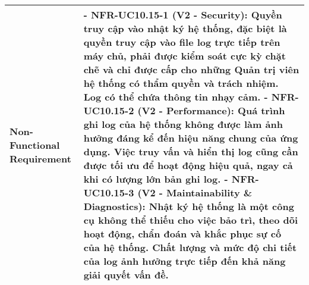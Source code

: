 \begin{longtable}{|m{4cm}|p{11cm}|}
Non-Functional Requirement & - \textbf{NFR-UC10.15-1 (V2 - Security):} Quyền truy cập vào nhật ký hệ thống, đặc biệt là quyền truy cập vào file log trực tiếp trên máy chủ, phải được kiểm soát cực kỳ chặt chẽ và chỉ được cấp cho những Quản trị viên hệ thống có thẩm quyền và trách nhiệm. Log có thể chứa thông tin nhạy cảm. \newline - \textbf{NFR-UC10.15-2 (V2 - Performance):} Quá trình ghi log của hệ thống không được làm ảnh hưởng đáng kể đến hiệu năng chung của ứng dụng. Việc truy vấn và hiển thị log cũng cần được tối ưu để hoạt động hiệu quả, ngay cả khi có lượng lớn bản ghi log. \newline - \textbf{NFR-UC10.15-3 (V2 - Maintainability \& Diagnostics):} Nhật ký hệ thống là một công cụ không thể thiếu cho việc bảo trì, theo dõi hoạt động, chẩn đoán và khắc phục sự cố của hệ thống. Chất lượng và mức độ chi tiết của log ảnh hưởng trực tiếp đến khả năng giải quyết vấn đề. \\
\hline
\end{longtable}

